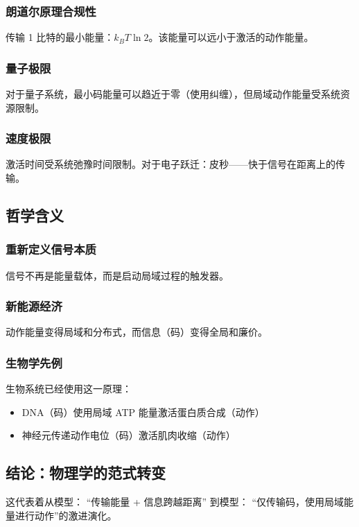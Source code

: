 \documentclass[11pt,a4paper]{article}
\begin{document}
	\subsubsection{朗道尔原理合规性}
	传输 1 比特的最小能量：$k_B T \ln 2$。该能量可以远小于激活的动作能量。
	
	\subsubsection{量子极限}
	对于量子系统，最小码能量可以趋近于零（使用纠缠），但局域动作能量受系统资源限制。
	
	\subsubsection{速度极限}
	激活时间受系统弛豫时间限制。对于电子跃迁：皮秒——快于信号在距离上的传输。
	
	\subsection{哲学含义}
	
	\subsubsection{重新定义信号本质}
	信号不再是能量载体，而是启动局域过程的触发器。
	
	\subsubsection{新能源经济}
	动作能量变得局域和分布式，而信息（码）变得全局和廉价。
	
	\subsubsection{生物学先例}
	生物系统已经使用这一原理：
	\begin{itemize}
		\item DNA（码）使用局域 ATP 能量激活蛋白质合成（动作）
		\item 神经元传递动作电位（码）激活肌肉收缩（动作）
	\end{itemize}
	
	\subsection{结论：物理学的范式转变}
	
	这代表着从模型：
	“传输能量 + 信息跨越距离”
	到模型：
	“仅传输码，使用局域能量进行动作”的激进演化。
	
\end{document}
